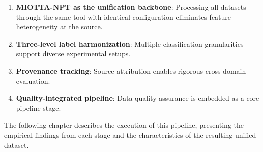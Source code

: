 \begin{enumerate}
    \item \textbf{MIOTTA-NPT as the unification backbone}: Processing all datasets through the same tool with identical configuration eliminates feature heterogeneity at the source.
    \item \textbf{Three-level label harmonization}: Multiple classification granularities support diverse experimental setups.
    \item \textbf{Provenance tracking}: Source attribution enables rigorous cross-domain evaluation.
    \item \textbf{Quality-integrated pipeline}: Data quality assurance is embedded as a core pipeline stage.
\end{enumerate}

The following chapter describes the execution of this pipeline, presenting the empirical findings from each stage and the characteristics of the resulting unified dataset.
